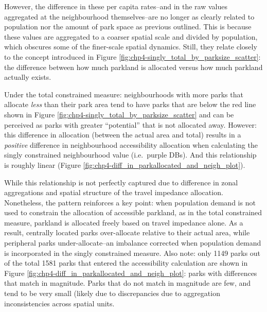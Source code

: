 \documentclass[
11pt, %
oneside, %
english, %
singlespacing, %
]{macthesis} %
\begin{document}
However, the difference in these per capita rates--and in the raw values aggregated at the neighbourhood themselves--are no longer as clearly related to population nor the amount of park space as previous outlined. This is because these values are aggregated to a coarser spatial scale and divided by population, which obscures some of the finer-scale spatial dynamics. Still, they relate closely to the concept introduced in Figure \ref{fig:chp4-singly_total_by_parksize_scatter}: the difference between how much parkland is allocated versus how much parkland actually exists.

Under the total constrained measure: neighbourhoods with more parks that allocate \emph{less} than their park area tend to have parks that are below the red line shown in Figure \ref{fig:chp4-singly_total_by_parksize_scatter} and can be perceived as parks with greater ``potential'' that is not allocated away. However: this difference in allocation (between the actual area and total) results in a \emph{positive} difference in neighbourhood accessibility allocation when calculating the singly constrained neighbourhood value (i.e.~purple DBs). And this relationship is roughly linear (Figure \ref{fig:chp4-diff_in_parkallocated_and_neigh_plot}).

While this relationship is not perfectly captured due to difference in zonal aggregations and spatial structure of the travel impedance allocation. Nonetheless, the pattern reinforces a key point: when population demand is not used to constrain the allocation of accessible parkland, as in the total constrained measure, parkland is allocated freely based on travel impedance alone. As a result, centrally located parks over-allocate relative to their actual area, while peripheral parks under-allocate--an imbalance corrected when population demand is incorporated in the singly constrained measure. Also note: only 1149 parks out of the total 1581 parks that entered the accessibility calculation are shown in Figure \ref{fig:chp4-diff_in_parkallocated_and_neigh_plot}: parks with differences that match in magnitude. Parks that do not match in magnitude are few, and tend to be very small (likely due to discrepancies due to aggregation inconsistencies across spatial units.
\end{document}
